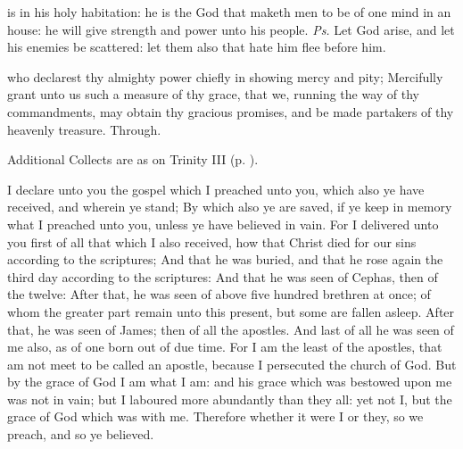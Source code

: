 

\introit
{} is in his holy habitation: he is the God that maketh men to be of one mind in an house: he will give strength and power unto his people. \textit{Ps.} Let God arise, and let his enemies be scattered: let them also that hate him flee before him.

\collect
{} who declarest thy almighty power chiefly in showing mercy and pity; Mercifully grant unto us such a measure of thy grace, that we, running the way of thy commandments, may obtain thy gracious promises, and be made partakers of thy heavenly treasure. Through.
\begin{rubric}
    Additional Collects are as on Trinity III (p. \pageref{TrinityIII}).
\end{rubric}

 I declare unto you the gospel which I preached unto you, which also ye have received, and wherein ye stand; By which also ye are saved, if ye keep in memory what I preached unto you, unless ye have believed in vain. For I delivered unto you first of all that which I also received, how that Christ died for our sins according to the scriptures; And that he was buried, and that he rose again the third day according to the scriptures: And that he was seen of Cephas, then of the twelve: After that, he was seen of above five hundred brethren at once; of whom the greater part remain unto this present, but some are fallen asleep. After that, he was seen of James; then of all the apostles. And last of all he was seen of me also, as of one born out of due time. For I am the least of the apostles, that am not meet to be called an apostle, because I persecuted the church of God. But by the grace of God I am what I am: and his grace which was bestowed upon me was not in vain; but I laboured more abundantly than they all: yet not I, but the grace of God which was with me. Therefore whether it were I or they, so we preach, and so ye believed.


